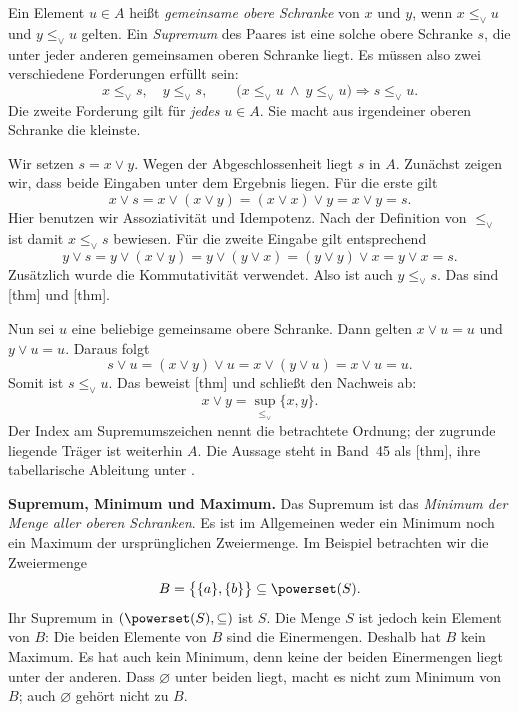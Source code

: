 Ein Element \(u\in A\) heißt \emph{gemeinsame obere Schranke}
von \(x\) und \(y\), wenn \(x\leq_\vee u\) und
\(y\leq_\vee u\) gelten. Ein \emph{Supremum} des Paares
ist eine solche obere Schranke \(s\), die unter jeder anderen
gemeinsamen oberen Schranke liegt. Es müssen also zwei verschiedene
Forderungen erfüllt sein:
\[
  x\leq_\vee s,\quad y\leq_\vee s,
  \qquad
  \bigl(x\leq_\vee u\ \land\ y\leq_\vee u\bigr)
       \Longrightarrow s\leq_\vee u.
\]
Die zweite Forderung gilt für \emph{jedes} \(u\in A\).
Sie macht aus irgendeiner oberen Schranke die kleinste.

Wir setzen \(s=x\vee y\). Wegen der Abgeschlossenheit liegt
\(s\) in \(A\). Zunächst zeigen wir, dass beide Eingaben unter
dem Ergebnis liegen. Für die erste gilt
\[
  x\vee s=x\vee(x\vee y)=(x\vee x)\vee y=x\vee y=s.
\]
Hier benutzen wir Assoziativität und Idempotenz. Nach der Definition
von \(\leq_\vee\) ist damit \(x\leq_\vee s\) bewiesen.
Für die zweite Eingabe gilt entsprechend
\[
  y\vee s
    =y\vee(x\vee y)
    =y\vee(y\vee x)
    =(y\vee y)\vee x
    =y\vee x
    =s.
\]
Zusätzlich wurde die Kommutativität verwendet. Also ist auch
\(y\leq_\vee s\). Das sind
[thm] und
[thm].

Nun sei \(u\) eine beliebige gemeinsame obere Schranke. Dann
gelten \(x\vee u=u\) und \(y\vee u=u\). Daraus folgt
\[
  s\vee u=(x\vee y)\vee u=x\vee(y\vee u)=x\vee u=u.
\]
Somit ist \(s\leq_\vee u\). Das beweist
[thm] und schließt den Nachweis ab:
\begin{equation}
  x\vee y=\sup_{\leq_\vee}\{x,y\}.
  \tag{S}\label{semilattice-reading-supremum}
\end{equation}
Der Index am Supremumszeichen nennt die betrachtete Ordnung;
der zugrunde liegende Träger ist weiterhin \(A\).
Die Aussage steht in Band~45 als
[thm], ihre tabellarische
Ableitung unter .

\medskip\noindent\textbf{Supremum, Minimum und Maximum.}
Das Supremum ist das \emph{Minimum der Menge aller oberen
Schranken}. Es ist im Allgemeinen weder ein Minimum noch ein
Maximum der ursprünglichen Zweiermenge. Im Beispiel betrachten wir
die Zweiermenge
\[
  B=\bigl\{\{a\},\{b\}\bigr\}\subseteq\powerset(S).
\]
Ihr Supremum in \((\powerset(S),\subseteq)\) ist \(S\).
Die Menge \(S\) ist jedoch kein Element von \(B\): Die beiden
Elemente von \(B\) sind die Einermengen. Deshalb hat \(B\)
kein Maximum. Es hat auch kein Minimum, denn keine der beiden
Einermengen liegt unter der anderen. Dass \(\varnothing\) unter
beiden liegt, macht es nicht zum Minimum von \(B\); auch
\(\varnothing\) gehört nicht zu \(B\).

